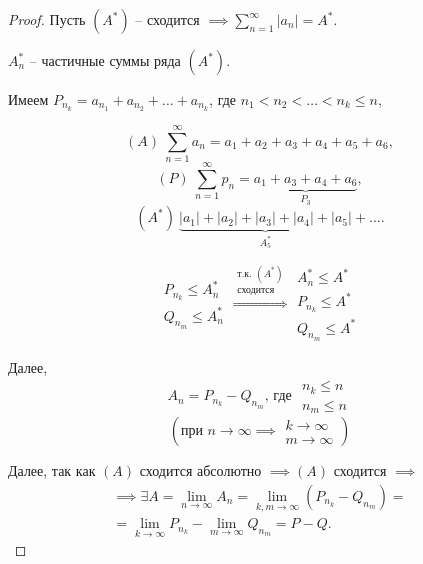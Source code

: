 \begin{proof}
    Пусть $(A^*)$ -- сходится $\implies \sum_{n=1}^{\infty}|a_n| = A^*$.

    $A_n^*$ -- частичные суммы ряда $(A^*)$.

    Имеем $P_{n_k} = a_{n_1} + a_{n_2} + \ldots + a_{n_k}$, где $n_1 < n_2 < \ldots < n_k \leqslant n $,
    \begin{example}
        \[
            (A) \ \sum_{n=1}^{\infty} a_n = a_1 + a_2 + a_3 + a_4 + a_5 + a_6,
        \]
        \[
            (P) \ \sum_{n=1}^{\infty} p_n = \underbrace{a_1 + a_3 + a_4 + a_6}_{P_3},
        \]
        \[
            (A^*) \ \underbrace{|a_1| + |a_2| + |a_3| + |a_4| + |a_5|}_{A_5^*} + \ldots.
        \]
    \end{example}
    \[
        \begin{array}{l}
            P_{n_k} \leqslant A_n^* \\
            Q_{n_m} \leqslant A_n^*
        \end{array} \overset{\begin{array}{c}
                \text{т.к. }(A^*) \\
                \text{сходится}
            \end{array}}{\Longrightarrow} \begin{array}{l}
            A_n^* \leqslant A^*  \\
            P_{n_k}\leqslant A^* \\
            Q_{n_m} \leqslant A^*
        \end{array}
    \]

    Далее,
    \[
        A_n = P_{n_k} - Q_{n_m}\text{, где }\begin{array}{l}
            n_k \leqslant n \\
            n_m \leqslant n
        \end{array}
    \]
    \[
        \left(\text{при } n\rightarrow\infty \implies \begin{array}{l}
            k \rightarrow\infty \\
            m \rightarrow\infty
        \end{array}\right)
    \]

    Далее, так как $(A)$ сходится абсолютно $\implies (A)$ сходится $\implies$
    \begin{multline*}
        \implies \exists A = \underset{n\rightarrow\infty}{\lim}A_n = \underset{k,m\rightarrow\infty}{\lim}(P_{n_k} - Q_{n_m}) = \\
        = \underset{k\rightarrow\infty}{\lim}P_{n_k} - \underset{m\rightarrow\infty}{\lim}Q_{n_m} = P - Q.
    \end{multline*}
\end{proof}


